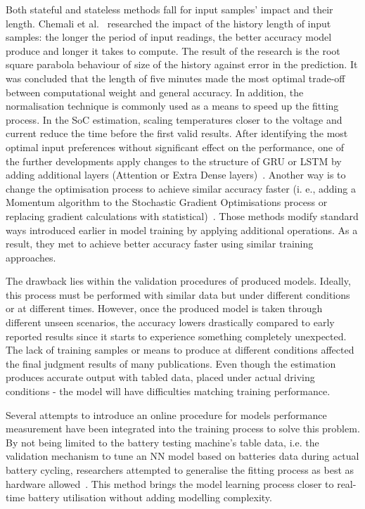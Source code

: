 %
%
Both stateful and stateless methods fall for input samples' impact and their length.
Chemali et al.~\cite{Chemali2017} researched the impact of the history length of input samples: the longer the period of input readings, the better accuracy model produce and longer it takes to compute.
The result of the research is the root square parabola behaviour of size of the history against error in the prediction.
It was concluded that the length of five minutes made the most optimal trade-off between computational weight and general accuracy.
In addition, the normalisation technique is commonly used as a means to speed up the fitting process.
In the SoC estimation, scaling temperatures closer to the voltage and current reduce the time before the first valid results.
After identifying the most optimal input preferences without significant effect on the performance, one of the further developments apply changes to the structure of GRU or LSTM by adding additional layers (Attention or Extra Dense layers)~\cite{mamo_long_2020, jiao_gru-rnn_2020}.
Another way is to change the optimisation process to achieve similar accuracy faster (i. e., adding a Momentum algorithm to the Stochastic Gradient Optimisations process or replacing gradient calculations with statistical)~\cite{xiao_accurate_2019, javid_adaptive_2020}.
Those methods modify standard ways introduced earlier in model training by applying additional operations. As a result, they met to achieve better accuracy faster using similar training approaches. 

%
%
The drawback lies within the validation procedures of produced models.
Ideally, this process must be performed with similar data but under different conditions or at different times.
However, once the produced model is taken through different unseen scenarios, the accuracy lowers drastically compared to early reported results since it starts to experience something completely unexpected.
The lack of training samples or means to produce at different conditions affected the final judgment results of many publications. 
Even though the estimation produces accurate output with tabled data, placed under actual driving conditions - the model will have difficulties matching training performance. 

%
%
Several attempts to introduce an online procedure for models performance measurement have been integrated into the training process to solve this problem.
By not being limited to the battery testing machine's table data, i.e. the validation mechanism to tune an NN model based on batteries data during actual battery cycling, researchers attempted to generalise the fitting process as best as hardware allowed~\cite{zhang_deep_2020}.
This method brings the model learning process closer to real-time battery utilisation without adding modelling complexity.


